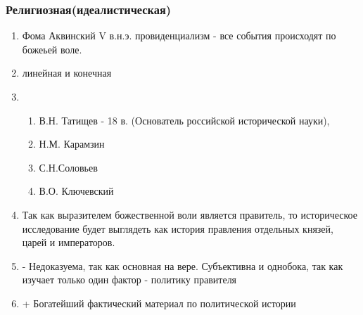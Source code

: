 \documentclass[a4paper]{article}
\begin{document}
\subsubsection{Религиозная(идеалистическая)}
\begin{enumerate}
\item Фома Аквинский V в.н.э.
 провиденциализм - все события происходят по божеьей воле.
\item линейная и конечная
\item
\begin{enumerate}
    \item В.Н. Татищев - 18 в. (Основатель российской исторической науки),
    \item Н.М. Карамзин
    \item С.Н.Соловьев
    \item В.О. Ключевский
\end{enumerate}
\item Так как выразителем божественной воли является правитель, то историческое исследование будет выглядеть как история правления отдельных князей, царей и императоров.
\item - Недоказуема, так как основная на вере. Субъективна и однобока, так как изучает только один фактор - политику правителя
\item + Богатейший фактический материал по политической истории

\end{enumerate}
\end{document}

